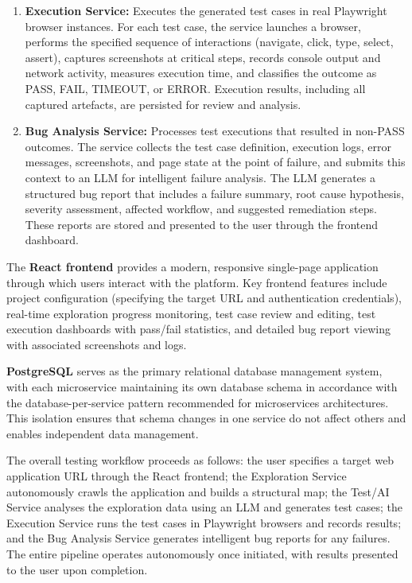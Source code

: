 \begin{enumerate}
    \item \textbf{Execution Service:} Executes the generated test cases in real Playwright browser instances. For each test case, the service launches a browser, performs the specified sequence of interactions (navigate, click, type, select, assert), captures screenshots at critical steps, records console output and network activity, measures execution time, and classifies the outcome as PASS, FAIL, TIMEOUT, or ERROR. Execution results, including all captured artefacts, are persisted for review and analysis.

    \item \textbf{Bug Analysis Service:} Processes test executions that resulted in non-PASS outcomes. The service collects the test case definition, execution logs, error messages, screenshots, and page state at the point of failure, and submits this context to an LLM for intelligent failure analysis. The LLM generates a structured bug report that includes a failure summary, root cause hypothesis, severity assessment, affected workflow, and suggested remediation steps. These reports are stored and presented to the user through the frontend dashboard.
\end{enumerate}

The \textbf{React frontend} provides a modern, responsive single-page application through which users interact with the platform. Key frontend features include project configuration (specifying the target URL and authentication credentials), real-time exploration progress monitoring, test case review and editing, test execution dashboards with pass/fail statistics, and detailed bug report viewing with associated screenshots and logs.

\textbf{PostgreSQL} serves as the primary relational database management system, with each microservice maintaining its own database schema in accordance with the database-per-service pattern recommended for microservices architectures. This isolation ensures that schema changes in one service do not affect others and enables independent data management.

The overall testing workflow proceeds as follows: the user specifies a target web application URL through the React frontend; the Exploration Service autonomously crawls the application and builds a structural map; the Test/AI Service analyses the exploration data using an LLM and generates test cases; the Execution Service runs the test cases in Playwright browsers and records results; and the Bug Analysis Service generates intelligent bug reports for any failures. The entire pipeline operates autonomously once initiated, with results presented to the user upon completion.


